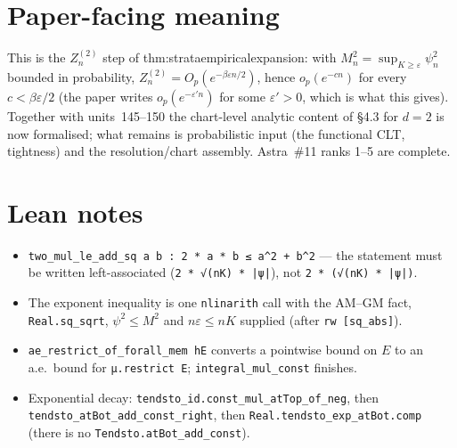 \documentclass[11pt]{article}
\begin{document}
\section{Paper-facing meaning}
This is the $Z_n^{(2)}$ step of thm:strataempiricalexpansion: with $M_n^2=\sup_{K\ge\varepsilon}\psi_n^2$
bounded in probability, $Z_n^{(2)}=O_p(e^{-\beta\varepsilon n/2})$, hence $o_p(e^{-cn})$ for every
$c<\beta\varepsilon/2$ (the paper writes $o_p(e^{-\varepsilon'n})$ for some $\varepsilon'>0$, which
is what this gives). Together with units~145--150 the chart-level analytic content of §4.3 for
$d=2$ is now formalised; what remains is probabilistic input (the functional CLT, tightness) and
the resolution/chart assembly. Astra~\#11 ranks 1--5 are complete.

\section{Lean notes}
\begin{itemize}
\item \texttt{two\_mul\_le\_add\_sq a b : 2 * a * b ≤ a\^{}2 + b\^{}2} — the statement must be written
left-associated (\texttt{2 * √(nK) * |ψ|}), not \texttt{2 * (√(nK) * |ψ|)}.
\item The exponent inequality is one \texttt{nlinarith} call with the AM--GM fact, \texttt{Real.sq\_sqrt},
$\psi^2\le M^2$ and $n\varepsilon\le nK$ supplied (after \texttt{rw [sq\_abs]}).
\item \texttt{ae\_restrict\_of\_forall\_mem hE} converts a pointwise bound on $E$ to an a.e.\ bound for
\texttt{μ.restrict E}; \texttt{integral\_mul\_const} finishes.
\item Exponential decay: \texttt{tendsto\_id.const\_mul\_atTop\_of\_neg}, then
\texttt{tendsto\_atBot\_add\_const\_right}, then \texttt{Real.tendsto\_exp\_atBot.comp}
(there is no \texttt{Tendsto.atBot\_add\_const}).
\end{itemize}
\end{document}
